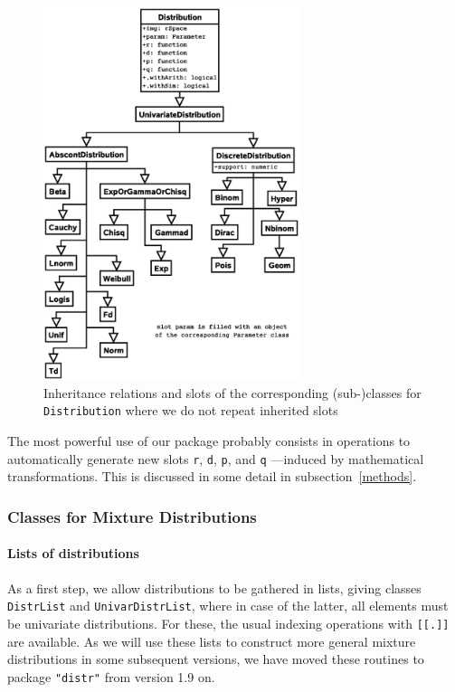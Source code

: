 \documentclass[11pt]{article}
\newcommand{\code}[1]{{\tt #1}}
\newcommand{\pkg}[1]{{\tt "#1"}}
\begin{document}
\begin{figure}[htb]\label{fig1}
  \begin{center}
    \includegraphics[viewport=130 150 500 730,width=7.5cm]{distribution.ps}%
    \caption{\label{fig1c}{\footnotesize Inheritance relations and slots of the 
    corresponding \mbox{(sub-)}classes for \code{Distribution} where we do not 
    repeat inherited slots
    }}
  \end{center}
\vspace{-1ex}
\end{figure}
\fi

The most powerful use of our package probably consists in operations to 
automatically generate new slots \code{r}, \code{d}, \code{p}, and \code{q} 
---induced by mathematical transformations. This is discussed in some detail in 
subsection~{\ref{methods}}.

\subsubsection{Classes for Mixture Distributions}

\paragraph{Lists of distributions}

As a first step, we allow distributions to be gathered in lists, giving
classes \code{DistrList} and \code{UnivarDistrList}, where in case of the latter,
all elements must be univariate distributions. For these, the usual indexing 
operations with \code{[[.]]} are available. As we will use these lists to 
construct more general mixture distributions in some subsequent versions, we 
have moved these routines to package \pkg{distr} from version 1.9 on.
\end{document}
